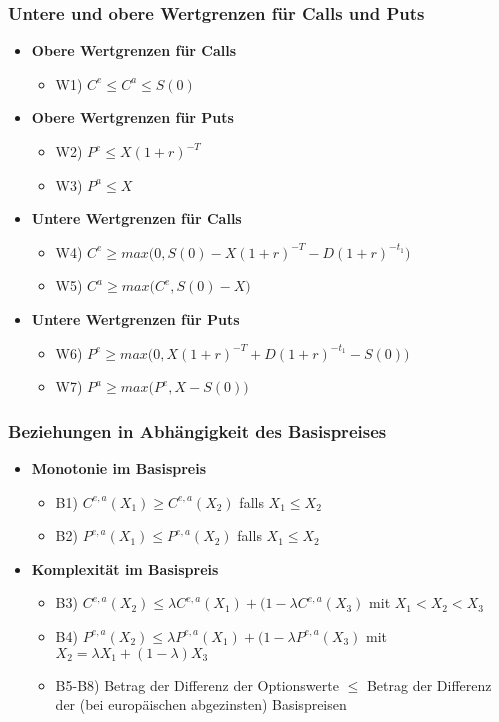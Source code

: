 \subsubsection{Untere und obere Wertgrenzen für Calls und Puts}
\begin{itemize}
	\item \textbf{Obere Wertgrenzen für Calls}
	\begin{itemize}
		\item W1) \(C^e \le C^a \le S(0)\)
	\end{itemize}
	\item \textbf{Obere Wertgrenzen für Puts}
	\begin{itemize}
		\item W2) \(P^e \le X(1+r)^{-T}\)
		\item W3) \(P^a \le X\)
	\end{itemize}
	\item \textbf{Untere Wertgrenzen für Calls}
	\begin{itemize}
		\item W4) \(C^e \ge max\big(0, S(0)-X(1+r)^{-T}-D(1+r)^{-t_1}\big)\)
		\item W5) \(C^a \ge max\big(C^e, S(0)-X\big)\)
	\end{itemize}
	\item \textbf{Untere Wertgrenzen für Puts}
	\begin{itemize}
		\item W6) \(P^e \ge max\big(0, X(1+r)^{-T}+D(1+r)^{-t_1}-S(0)\big)\)
		\item W7) \(P^a \ge max\big(P^e, X-S(0)\big)\)
	\end{itemize}
\end{itemize}

\subsubsection{Beziehungen in Abhängigkeit des Basispreises}
\begin{itemize}
	\item \textbf{Monotonie im Basispreis}
	\begin{itemize}
		\item B1) \(C^{e,a}(X_1) \ge C^{e,a}(X_2)\) falls \(X_1 \le X_2\)
		\item B2) \(P^{e,a}(X_1) \le P^{e,a}(X_2)\) falls \(X_1 \le X_2\)
	\end{itemize}
	\item \textbf{Komplexität im Basispreis}
	\begin{itemize}
		\item B3) \(C^{e,a}(X_2) \le \lambda C^{e,a}(X_1) + (1-\lambda C^{e,a}(X_3)\) mit \(X_1 < X_2 < X_3\)
		\item B4) \(P^{e,a}(X_2) \le \lambda P^{e,a}(X_1) + (1-\lambda P^{e,a}(X_3)\) mit \(X_2 = \lambda X_1 + (1-\lambda) X_3\)
		\item B5-B8) Betrag der Differenz der Optionswerte \(\le\) Betrag der Differenz der (bei europäischen abgezinsten) Basispreisen
	\end{itemize}
\end{itemize}

